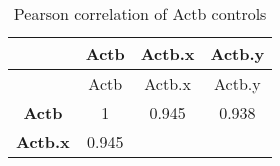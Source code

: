 \documentclass[]{article}
\begin{document}
\begin{longtable}[c]{@{}cccc@{}}
\caption{Pearson correlation of Actb controls}\tabularnewline
\toprule
\begin{minipage}[b]{0.16\columnwidth}\centering\strut
~
\strut\end{minipage} &
\begin{minipage}[b]{0.09\columnwidth}\centering\strut
Actb
\strut\end{minipage} &
\begin{minipage}[b]{0.11\columnwidth}\centering\strut
Actb.x
\strut\end{minipage} &
\begin{minipage}[b]{0.11\columnwidth}\centering\strut
Actb.y
\strut\end{minipage}\tabularnewline
\midrule
\endfirsthead
\toprule
\begin{minipage}[b]{0.16\columnwidth}\centering\strut
~
\strut\end{minipage} &
\begin{minipage}[b]{0.09\columnwidth}\centering\strut
Actb
\strut\end{minipage} &
\begin{minipage}[b]{0.11\columnwidth}\centering\strut
Actb.x
\strut\end{minipage} &
\begin{minipage}[b]{0.11\columnwidth}\centering\strut
Actb.y
\strut\end{minipage}\tabularnewline
\midrule
\endhead
\begin{minipage}[t]{0.16\columnwidth}\centering\strut
\textbf{Actb}
\strut\end{minipage} &
\begin{minipage}[t]{0.09\columnwidth}\centering\strut
1
\strut\end{minipage} &
\begin{minipage}[t]{0.11\columnwidth}\centering\strut
0.945
\strut\end{minipage} &
\begin{minipage}[t]{0.11\columnwidth}\centering\strut
0.938
\strut\end{minipage}\tabularnewline
\begin{minipage}[t]{0.16\columnwidth}\centering\strut
\textbf{Actb.x}
\strut\end{minipage} &
\begin{minipage}[t]{0.09\columnwidth}\centering\strut
0.945
\strut\end{minipage} &
\begin{minipage}[t]{0.11\columnwidth}\centering\strut

\end{minipage}
\end{longtable}
\end{document}
